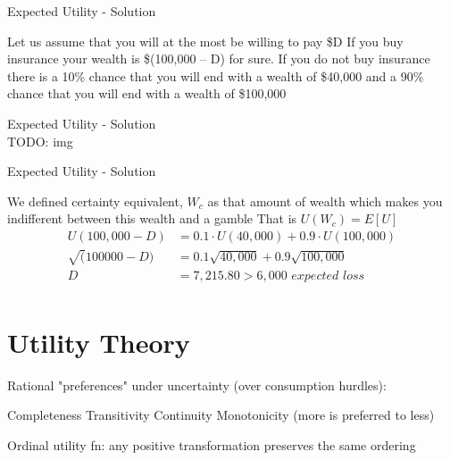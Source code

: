 \documentclass[
14pt,notheorems,hyperref={pdfauthor=whatever}
]{beamer}
\begin{document}
\begin{frame}
Expected Utility - Solution
\hfill \break
\begin{outline}
    \1 Let us assume that you will at the most be willing to pay \$D\break
    \1 If you buy insurance your wealth is \$(100,000 – D) for sure.\break
    \1 If you do not buy insurance there is a 10\% chance that you will end with a wealth of \$40,000 and a 90\% chance that you will end with a wealth of \$100,000\break
\end{outline}
\end{frame}

\begin{frame}
Expected Utility - Solution\\
TODO: img
\end{frame}

\begin{frame}
Expected Utility - Solution
\hfill \break
\begin{outline}
    \1 We defined certainty equivalent, $W_c$  as that amount of wealth which makes you indifferent between this wealth and a gamble\break
    \1 That is $U(W_c) = E[U]$
    \begin{align*}
        U(100,000 - D) &= 0.1\cdot U(40,000) + 0.9\cdot U(100,000)\\
        \sqrt(100000-D) &= 0.1\sqrt{40,000} + 0.9\sqrt{100,000}\\
        D &= 7,215.80 > 6,000 \textit{ expected loss }\\
    \end{align*}
\end{outline}
\end{frame}


\section{Utility Theory}  %

\begin{frame}
Rational "preferences" under uncertainty (over consumption hurdles):\\
\begin{outline}
    \1 Completeness
    \1 Transitivity
    \1 Continuity
    \1 Monotonicity (more is preferred to less)
\end{outline}
Ordinal utility fn: any positive transformation preserves the same ordering\\
\end{frame}
\end{document}
